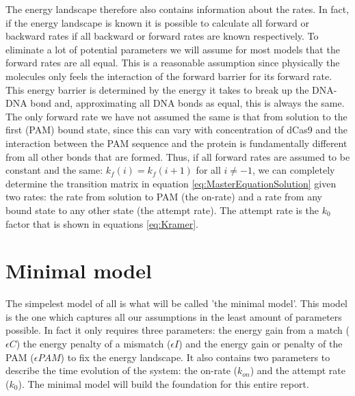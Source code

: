 The energy landscape therefore also contains information about the rates. In fact, if the energy landscape is known it is possible to calculate all forward or backward rates if all backward or forward rates are known respectively. To eliminate a lot of potential parameters we will assume for most models that the forward rates are all equal. This is a reasonable assumption since physically the molecules only feels the interaction of the forward barrier for its forward rate. This energy barrier is determined by the energy it takes to break up the DNA-DNA bond and, approximating all DNA bonds as equal, this is always the same. The only forward rate we have not assumed the same is that from solution to the first (PAM) bound state, since this can vary with concentration of dCas9 and the interaction between the PAM sequence and the protein is fundamentally different from all other bonds that are formed. Thus, if all forward rates are assumed to be constant and the same: $k_f(i) = k_f(i+1)$ for all $i \neq -1$, we can completely determine the transition matrix in equation \ref{eq:MasterEquationSolution} given two rates: the rate from solution to PAM (the on-rate) and a rate from any bound state to any other state (the attempt rate). The attempt rate is the $k_0$ factor that is shown in equations \ref{eq:Kramer}.



\section{Minimal model}
The simpelest model of all is what will be called 'the minimal model'. This model is the one which captures all our assumptions in the least amount of parameters possible. In fact it only requires three parameters: the energy gain from a match ($\epsilon C$) the energy penalty of a mismatch ($\epsilon I$) and the energy gain or penalty of the PAM ($\epsilon PAM$) to fix the energy landscape. It also contains two parameters to describe the time evolution of the system: the on-rate ($k_{on}$) and the attempt rate ($k_0$). The minimal model will build the foundation for this entire report.

